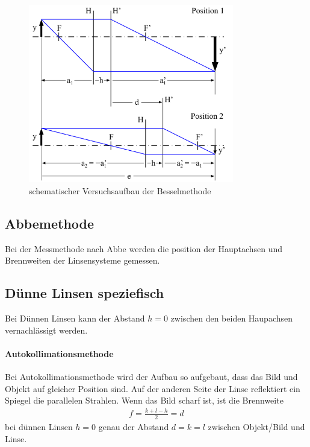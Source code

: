 \documentclass[11pt, a4paper]{article}
\begin{document}
    \begin{figure}
        \centering
        \includegraphics[width=0.8\textwidth]{Bessel_Abb.png}
        \caption{schematischer Versuchsaufbau der Besselmethode \cite{OPA}}   %
        \label{fig:BesselAbb}
    \end{figure}

    \subsection{Abbemethode}

    Bei der Messmethode nach Abbe werden die position der Hauptachsen und Brennweiten der Linsensysteme gemessen. 

    \subsection{Dünne Linsen speziefisch}
    Bei Dünnen Linsen kann der Abstand $h = 0$ zwischen den beiden Haupachsen vernachlässigt werden.
    
    \paragraph{Autokollimationsmethode}
    Bei Autokollimationsmethode wird der Aufbau so aufgebaut, dass das Bild und Objekt auf gleicher Position sind. Auf der anderen Seite der Linse reflektiert ein Spiegel die parallelen Strahlen. Wenn das Bild scharf ist, ist die Brennweite
    \begin{align}
        f = \frac{k + l - h}{2}  = d \label{eq:auto}
    \end{align}
    bei dünnen Linsen $h=0$ genau der Abstand $d = k = l$ zwischen Objekt/Bild und Linse.
\end{document}
